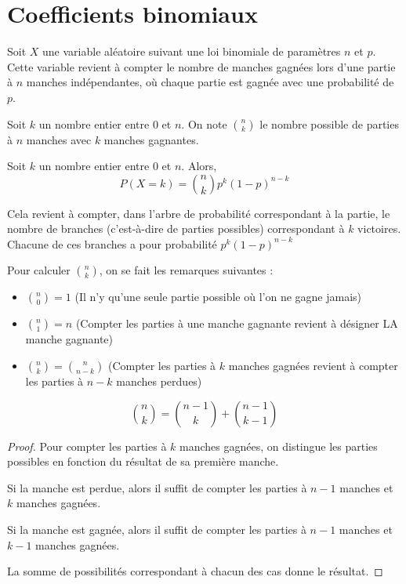 \documentclass{poly}
\begin{document}
\section{Coefficients binomiaux}
Soit $X$ une variable aléatoire suivant une loi binomiale de paramètres $n$ et $p$. Cette variable revient à compter le nombre de manches gagnées lors d'une partie à $n$ manches indépendantes, où chaque partie est gagnée avec une probabilité de $p$. 
\begin{definition}
Soit $k$ un nombre entier entre $0$ et $n$. On note $\binom{n}{k}$ le nombre possible de parties à $n$ manches avec $k$ manches gagnantes.
\end{definition}
\begin{proposition}
Soit $k$ un nombre entier entre $0$ et $n$. Alors,
\begin{equation*}
P(X = k) = \binom{n}{k}p^k(1-p)^{n-k}
\end{equation*}
\end{proposition}
\begin{remark}
Cela revient à compter, dans l'arbre de probabilité correspondant à la partie, le nombre de branches (c'est-à-dire de parties possibles) correspondant à $k$ victoires. Chacune de ces branches a pour probabilité $p^k(1-p)^{n-k}$
\end{remark}
Pour calculer $\binom{n}{k}$, on se fait les remarques suivantes :
\begin{proposition}
\hfill
\begin{itemize}
\item $\binom{n}{0} = 1$ (Il n'y qu'une seule partie possible où l'on ne gagne jamais)
\item $\binom{n}{1} = n$ (Compter les parties à une manche gagnante revient à désigner LA manche gagnante)
\item $\binom{n}{k} = \binom{n}{n-k}$ (Compter les parties à $k$ manches gagnées revient à compter les parties à $n - k$ manches perdues) 
\end{itemize}
\end{proposition}
\begin{proposition}
\begin{equation*}
\binom{n}{k} = \binom{n-1}{k} + \binom{n-1}{k-1}
\end{equation*}
\end{proposition}
\begin{proof}
Pour compter les parties à $k$ manches gagnées, on distingue les parties possibles en fonction du résultat de sa première manche.

Si la manche est perdue, alors il suffit de compter les parties à $n - 1$ manches et $k$ manches gagnées. 

Si la manche est gagnée, alors il suffit de compter les parties à $n - 1$ manches et $k - 1$ manches gagnées.

La somme de possibilités correspondant à chacun des cas donne le résultat.
\end{proof}
\end{document}
